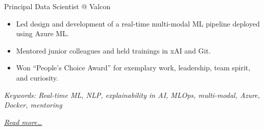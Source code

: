 \large{Principal Data Scientist @ Valcon}

\normalsize
\begin{itemize}  
    \item Led design and development of a real-time multi-modal ML pipeline deployed using Azure ML.
    \item Mentored junior colleagues and held trainings in xAI and Git.
    \item Won “People's Choice Award” for exemplary work, leadership, team
    spirit, and curiosity.
\end{itemize}

{\footnotesize\textit{Keywords: Real-time ML, NLP, explainability in AI, MLOps, multi-modal, Azure, Docker, mentoring}}

\hfill{\small{\textit{\hyperref[sec:valcon]{Read more…}}}}

